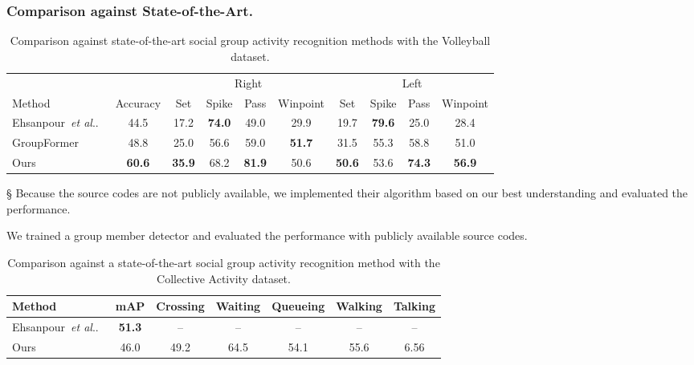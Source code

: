 \documentclass[runningheads]{llncs}
\makeatletter
\DeclareRobustCommand\onedot{\futurelet\@let@token\@onedot}
\def\@onedot{\ifx\@let@token.\else.\null\fi\xspace}
\def\etal{\emph{et al}\onedot}
\makeatother
\begin{document}
\subsubsection{Comparison against State-of-the-Art.}
\begin{table}[t]
 \caption{Comparison against state-of-the-art social group activity recognition methods with the Volleyball dataset.}
 \label{table:comp_socialgroup_volley}
 \centering
 \setlength{\tabcolsep}{2.2pt}
 \begin{threeparttable}
  \begin{tabular}{@{}lccccccccc@{}}
   \toprule
   & & \multicolumn{4}{c}{Right} & \multicolumn{4}{c}{Left} \\
   \cmidrule(lr){3-6}\cmidrule(lr){7-10}
   Method & Accuracy & Set & Spike & Pass & Winpoint & Set & Spike & Pass & Winpoint \\
   \midrule
   Ehsanpour~\etal~\cite{ehsanpour_eccv2020}\tnote{\S} & 44.5 & 17.2 & \textbf{74.0} & 49.0 & 29.9 & 19.7 & \textbf{79.6} & 25.0 & 28.4 \\
   GroupFormer~\cite{li_iccv2021}\tnote{\ddag} & 48.8 & 25.0 & 56.6 & 59.0 & \textbf{51.7} & 31.5 & 55.3 & 58.8 & 51.0 \\
   \midrule
   Ours & \textbf{60.6} & \textbf{35.9} & 68.2 & \textbf{81.9} & 50.6 & \textbf{50.6} & 53.6 & \textbf{74.3} & \textbf{56.9} \\
   \bottomrule
  \end{tabular}
  \begin{tablenotes}\footnotesize
    \item[\S] Because the source codes are not publicly available, we implemented their algorithm based on our best understanding and evaluated the performance.
    \item[\ddag] We trained a group member detector and evaluated the performance with publicly available source codes.
  \end{tablenotes}
 \end{threeparttable}
 \vspace{-1.0em}
\end{table}

\begin{table}[t]
 \caption{Comparison against a state-of-the-art social group activity recognition method with the Collective Activity dataset.}
 \label{table:comp_socialgroup_collective}
 \centering
 \setlength{\tabcolsep}{6pt}
 \begin{tabular}{@{}lcccccc@{}}
  \toprule
  Method & mAP & Crossing & Waiting & Queueing & Walking & Talking \\
  \midrule
  Ehsanpour~\etal~\cite{ehsanpour_eccv2020} & \textbf{51.3} & -- & -- & -- & -- & -- \\
  \midrule
  Ours & 46.0 & 49.2 & 64.5 & 54.1 & 55.6 & 6.56 \\
  \bottomrule
 \end{tabular}
 \vspace{-1.0em}
\end{table}
\end{document}
